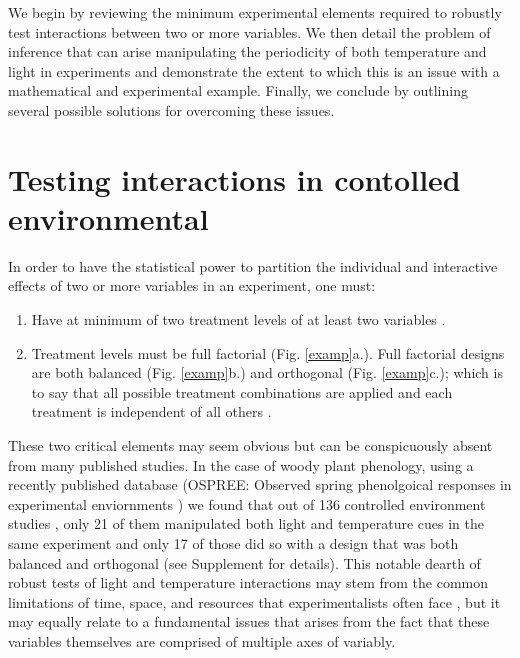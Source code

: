 \documentclass[11pt]{article}
\begin{document}
We begin by reviewing the minimum experimental elements required to robustly test interactions between two or more variables. We then detail the problem of inference that can arise manipulating the periodicity of both temperature and light in experiments and demonstrate the extent to which this is an issue with a mathematical and experimental example. Finally, we conclude by outlining several possible solutions for overcoming these issues. 

\section{Testing interactions in contolled environmental}
In order to have the statistical power to partition the individual and interactive effects of two or more variables in an experiment, one must:
\begin{enumerate}
\item Have at minimum of two treatment levels of at least two variables \citep{}.
\item Treatment levels must be full factorial (Fig. \ref{examp}a.). Full factorial designs are both balanced (Fig. \ref{examp}b.)  and orthogonal (Fig. \ref{examp}c.); which is to say that all possible treatment combinations are applied and each treatment is independent of all others \citep{}.
\end{enumerate}

These two critical elements may seem obvious but can be conspicuously absent from many published studies. In the case of woody plant phenology, using a recently published database (OSPREE: Observed spring phenolgoical responses in experimental enviornments \citep{}) we found that out of 136 controlled environment studies \citep{}, only 21 of them manipulated both light and temperature cues in the same experiment and only 17 of those did so with a design that was both balanced and orthogonal (see Supplement for details). This notable dearth of robust tests of light and temperature interactions may stem from the common limitations of time, space, and resources that experimentalists often face \citep{}, but it may equally relate to a fundamental issues that arises from the fact that these variables themselves are comprised of multiple axes of variably.
\end{document}
